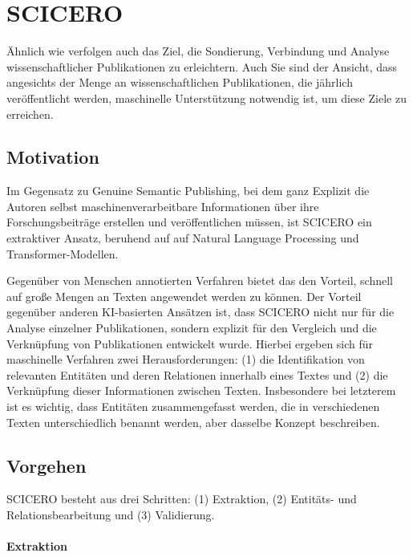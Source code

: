 \section{SCICERO}
\label{sec:scicero}

Ähnlich wie \citet{kuhn2017genuine} verfolgen auch \citet{DESSI2022109945} das Ziel, die Sondierung, Verbindung und Analyse wissenschaftlicher Publikationen zu erleichtern.
Auch Sie sind der Ansicht, dass angesichts der Menge an wissenschaftlichen Publikationen, die jährlich veröffentlicht werden, maschinelle Unterstützung notwendig ist, um diese Ziele zu erreichen.



\subsection{Motivation}

Im Gegensatz zu Genuine Semantic Publishing, bei dem ganz Explizit die Autoren selbst maschinenverarbeitbare Informationen über ihre Forschungsbeiträge erstellen und veröffentlichen müssen, ist SCICERO ein extraktiver Ansatz, beruhend auf auf Natural Language Processing und Transformer-Modellen.

Gegenüber von Menschen annotierten Verfahren bietet das den Vorteil, schnell auf große Mengen an Texten angewendet werden zu können.
Der Vorteil gegenüber anderen KI-basierten Ansätzen ist, dass SCICERO nicht nur für die Analyse einzelner Publikationen, sondern explizit für den Vergleich und die Verknüpfung von Publikationen entwickelt wurde.
Hierbei ergeben sich für maschinelle Verfahren zwei Herausforderungen: (1) die Identifikation von relevanten Entitäten und deren Relationen innerhalb eines Textes und (2) die Verknüpfung dieser Informationen zwischen Texten.
Insbesondere bei letzterem ist es wichtig, dass Entitäten zusammengefasst werden, die in verschiedenen Texten unterschiedlich benannt werden, aber dasselbe Konzept beschreiben.

\subsection{Vorgehen}
\label{subsec:scicero-vorgehen}

SCICERO besteht aus drei Schritten: (1) Extraktion, (2) Entitäts- und Relationsbearbeitung und (3) Validierung.

\paragraph{Extraktion}

